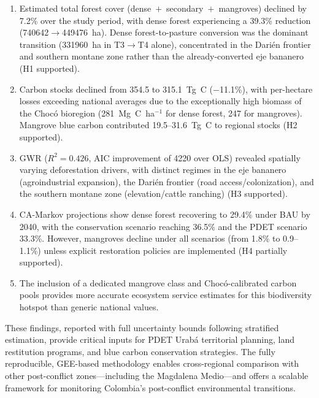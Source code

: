 \documentclass[12pt,a4paper]{article}
\begin{document}
\begin{enumerate}[label=\arabic*.]
\item Estimated total forest cover (dense~$+$~secondary~$+$~mangroves) declined by 7.2\% over the study period, with dense forest experiencing a 39.3\% reduction (\num{740642}$\rightarrow$\num{449476}~ha). Dense forest-to-pasture conversion was the dominant transition (\num{331960}~ha in T3$\rightarrow$T4 alone), concentrated in the Dari\'{e}n frontier and southern montane zone rather than the already-converted eje bananero (H1 supported).
\item Carbon stocks declined from 354.5 to 315.1~Tg~C ($-$11.1\%), with per-hectare losses exceeding national averages due to the exceptionally high biomass of the Choc\'{o} bioregion (281~Mg~C~ha$^{-1}$ for dense forest, 247 for mangroves). Mangrove blue carbon contributed 19.5--31.6~Tg~C to regional stocks (H2 supported).
\item GWR ($R^2 = 0.426$, AIC improvement of \num{4220} over OLS) revealed spatially varying deforestation drivers, with distinct regimes in the eje bananero (agroindustrial expansion), the Dari\'{e}n frontier (road access/colonization), and the southern montane zone (elevation/cattle ranching) (H3 supported).
\item CA-Markov projections show dense forest recovering to 29.4\% under BAU by 2040, with the conservation scenario reaching 36.5\% and the PDET scenario 33.3\%. However, mangroves decline under all scenarios (from 1.8\% to 0.9--1.1\%) unless explicit restoration policies are implemented (H4 partially supported).
\item The inclusion of a dedicated mangrove class and Choc\'{o}-calibrated carbon pools provides more accurate ecosystem service estimates for this biodiversity hotspot than generic national values.
\end{enumerate}

These findings, reported with full uncertainty bounds following \citet{Olofsson2014} stratified estimation, provide critical inputs for PDET Urab\'{a} territorial planning, land restitution programs, and blue carbon conservation strategies. The fully reproducible, GEE-based methodology enables cross-regional comparison with other post-conflict zones---including the Magdalena Medio---and offers a scalable framework for monitoring Colombia's post-conflict environmental transitions.


\end{document}

